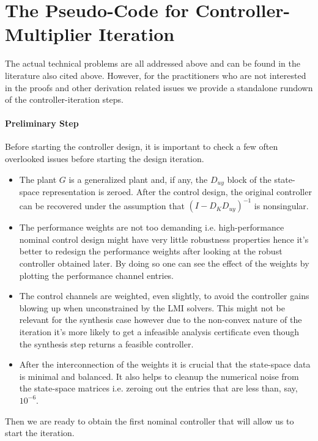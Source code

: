 \section{The Pseudo-Code for Controller-Multiplier Iteration}
The actual technical problems are all addressed above and can be found in the literature also cited above. However, 
for the practitioners who are not interested in the proofs and other derivation related issues we provide a standalone 
rundown of the controller-iteration steps. 


\paragraph{Preliminary Step} Before starting the controller design, it is important to check a few often overlooked issues before
starting the design iteration.
\begin{itemize}
	\item The plant $G$ is a generalized plant and, if any, the $D_{uy}$ block of the state-space representation is zeroed. After the
	control design, the original controller can be recovered under the assumption that $(I-D_KD_{uy})^{-1}$ is nonsingular.
	\item The performance weights are not too demanding i.e. high-performance nominal control design might have very little robustness
	properties hence it's better to redesign the performance weights after looking at the robust controller obtained later. By doing
	so one can see the effect of the weights by plotting the performance channel entries. 
	\item The control channels are weighted, even slightly, to avoid the controller gains blowing up when unconstrained by the LMI solvers.
	This might not be relevant for the synthesis case however due to the non-convex nature of the iteration it's more likely to get a 
	infeasible analysis certificate even though the synthesis step returns a feasible controller.
	\item After the interconnection of the weights it is crucial that the state-space data is minimal and balanced. It also helps to
	cleanup the numerical noise from the state-space matrices i.e. zeroing out the entries that are less than, say, $10^{-6}$. 
\end{itemize}
Then we are ready to obtain the first nominal controller that will allow us to start the iteration. 
